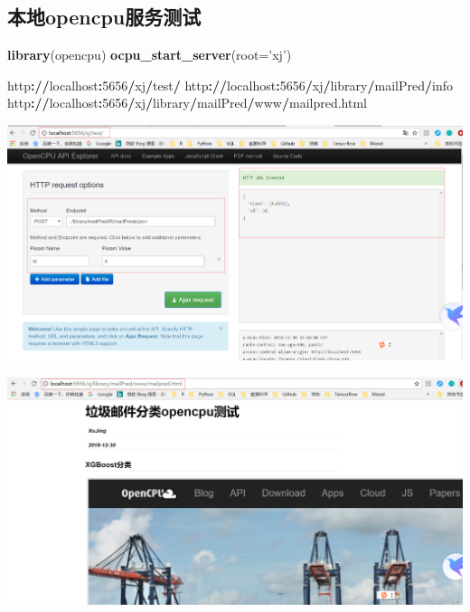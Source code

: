 \documentclass[]{book}
\newenvironment{Shaded}{\begin{snugshade}}{\end{snugshade}}
\newcommand{\KeywordTok}[1]{\textcolor[rgb]{0.13,0.29,0.53}{\textbf{#1}}}
\newcommand{\DataTypeTok}[1]{\textcolor[rgb]{0.13,0.29,0.53}{#1}}
\newcommand{\DecValTok}[1]{\textcolor[rgb]{0.00,0.00,0.81}{#1}}
\newcommand{\StringTok}[1]{\textcolor[rgb]{0.31,0.60,0.02}{#1}}
\newcommand{\OperatorTok}[1]{\textcolor[rgb]{0.81,0.36,0.00}{\textbf{#1}}}
\newcommand{\ErrorTok}[1]{\textcolor[rgb]{0.64,0.00,0.00}{\textbf{#1}}}
\newcommand{\NormalTok}[1]{#1}
\begin{document}
\subsection{本地opencpu服务测试}\label{opencpu}

\begin{Shaded}
\begin{Highlighting}[]
\KeywordTok{library}\NormalTok{(opencpu)}
\KeywordTok{ocpu_start_server}\NormalTok{(}\DataTypeTok{root=}\StringTok{'xj'}\NormalTok{)}
\end{Highlighting}
\end{Shaded}

\begin{Shaded}
\begin{Highlighting}[]
\NormalTok{http}\OperatorTok{:}\ErrorTok{//}\NormalTok{localhost}\OperatorTok{:}\DecValTok{5656}\OperatorTok{/}\NormalTok{xj}\OperatorTok{/}\NormalTok{test}\OperatorTok{/}
\NormalTok{http}\OperatorTok{:}\ErrorTok{//}\NormalTok{localhost}\OperatorTok{:}\DecValTok{5656}\OperatorTok{/}\NormalTok{xj}\OperatorTok{/}\NormalTok{library}\OperatorTok{/}\NormalTok{mailPred}\OperatorTok{/}\NormalTok{info}
\NormalTok{http}\OperatorTok{:}\ErrorTok{//}\NormalTok{localhost}\OperatorTok{:}\DecValTok{5656}\OperatorTok{/}\NormalTok{xj}\OperatorTok{/}\NormalTok{library}\OperatorTok{/}\NormalTok{mailPred}\OperatorTok{/}\NormalTok{www}\OperatorTok{/}\NormalTok{mailpred.html}
\end{Highlighting}
\end{Shaded}

\includegraphics{pic/opencpu/p15.png}

\includegraphics{pic/opencpu/p16.png}
\end{document}
